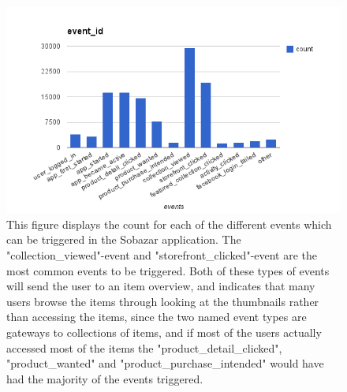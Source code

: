     \begin{figure}[H]
        \includegraphics[width=5in]{image/event_id.png}
        \centering
        \caption[Count for different events]{This figure displays the count for each of the different events which can be triggered in the Sobazar application.
        The "collection\_viewed"-event and "storefront\_clicked"-event are the most common events to be triggered.
        Both of these types of events will send the user to an item overview, and indicates that many users browse the items through looking at the thumbnails rather than accessing the items, since the two named event types are gateways to collections of items, and if most of the users actually accessed most of the items the "product\_detail\_clicked", "product\_wanted" and "product\_purchase\_intended" would have had the majority of the events triggered.}
    \end{figure}
